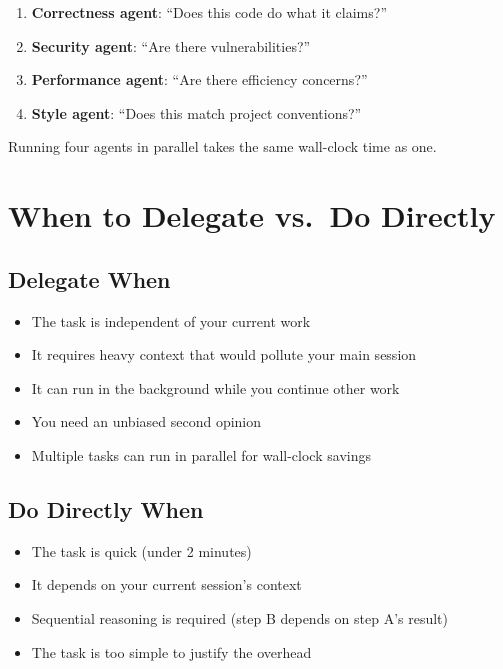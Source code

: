 
\begin{enumerate}
  \item \textbf{Correctness agent}: ``Does this code do what it claims?''
  \item \textbf{Security agent}: ``Are there vulnerabilities?''
  \item \textbf{Performance agent}: ``Are there efficiency concerns?''
  \item \textbf{Style agent}: ``Does this match project conventions?''
\end{enumerate}

Running four agents in parallel takes the same wall-clock time as one.

\section{When to Delegate vs.\ Do Directly}
\label{sec:delegation-decision}


\subsection{Delegate When}

\begin{itemize}
  \item The task is independent of your current work
  \item It requires heavy context that would pollute your main session
  \item It can run in the background while you continue other work
  \item You need an unbiased second opinion
  \item Multiple tasks can run in parallel for wall-clock savings
\end{itemize}

\subsection{Do Directly When}

\begin{itemize}
  \item The task is quick (under 2 minutes)
  \item It depends on your current session's context
  \item Sequential reasoning is required (step B depends on step A's result)
  \item The task is too simple to justify the overhead
\end{itemize}

